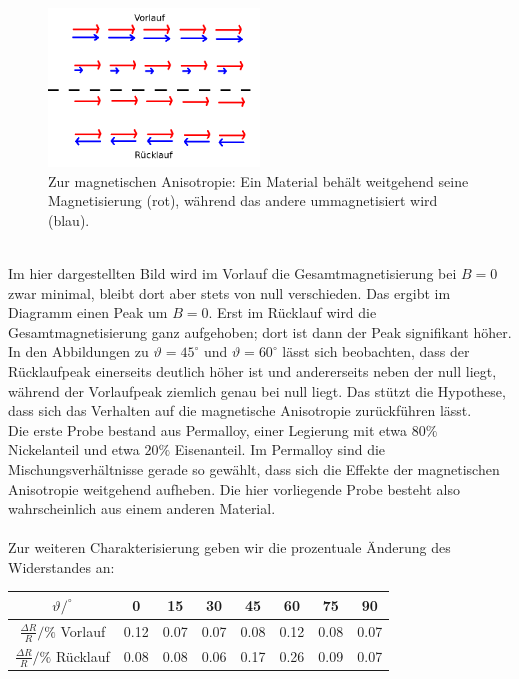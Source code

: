 \documentclass[german,  %
parskip=full,  %
]{scrartcl}
\begin{document}
\begin{figure}[h!]\centering
\includegraphics[width=0.5\textwidth]{Magnetische_Anisotropie.png}
\caption{Zur magnetischen Anisotropie: Ein Material behält weitgehend seine Magnetisierung (rot), während das andere ummagnetisiert wird (blau).}
\end{figure} \\
Im hier dargestellten Bild wird im Vorlauf die Gesamtmagnetisierung bei \(B=0\) zwar minimal, bleibt dort aber stets von null verschieden. Das ergibt im Diagramm einen Peak um \(B=0\). Erst im Rücklauf wird die Gesamtmagnetisierung ganz aufgehoben; dort ist dann der Peak signifikant höher. In den Abbildungen zu \(\vartheta=45^{\circ}\) und \(\vartheta= 60^{\circ}\) lässt sich beobachten, dass der Rücklaufpeak einerseits deutlich höher ist und andererseits neben der null liegt, während der Vorlaufpeak ziemlich genau bei null liegt. Das stützt die Hypothese, dass sich das Verhalten auf die magnetische Anisotropie zurückführen lässt. \\
Die erste Probe bestand aus Permalloy, einer Legierung mit etwa \(80 \%\) Nickelanteil und etwa \(20 \%\) Eisenanteil. Im Permalloy sind die Mischungsverhältnisse gerade so gewählt, dass sich die Effekte der magnetischen Anisotropie weitgehend aufheben. Die hier vorliegende Probe besteht also wahrscheinlich aus einem anderen Material. \\\\
Zur weiteren Charakterisierung geben wir die prozentuale Änderung des Widerstandes an: 
\newpage
\begin{table}[h!]\centering
\begin{tabular}{|c|c|c|c|c|c|c|c|}
\hline
\(\vartheta / ^{\circ}\) & 0 & 15 & 30 & 45 & 60 & 75 & 90 \\\hline
\(\frac{\Delta R}{R} / \% \) Vorlauf & 0.12 & 0.07 & 0.07 & 0.08 & 0.12 & 0.08 & 0.07 \\\hline
\(\frac{\Delta R}{R} / \% \) Rücklauf & 0.08 & 0.08 & 0.06 & 0.17 & 0.26 & 0.09 & 0.07 \\\hline
\end{tabular}
\end{table} 
\end{document}
